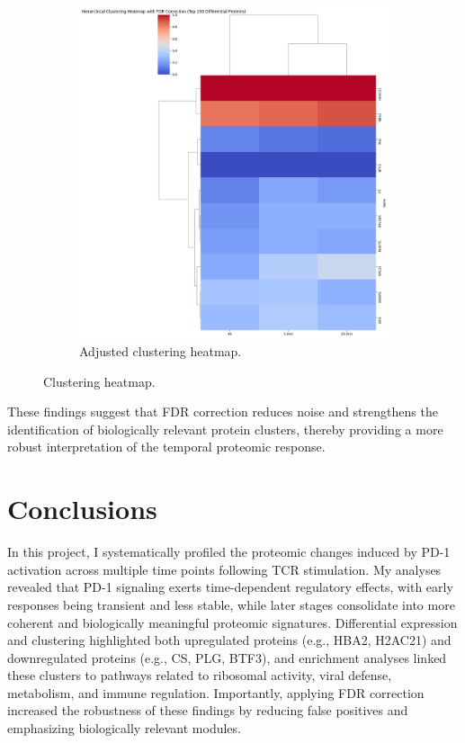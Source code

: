 \documentclass{article}
\begin{document}
\begin{figure}[H]
\begin{subfigure}{0.45\textwidth}
            \includegraphics[width=\linewidth]{figures/clustering_heatmap_fdr.png}
            \caption{Adjusted clustering heatmap.}
            \label{fig:clustering_heatmap_fdr}
        \end{subfigure}
        \caption{Clustering heatmap.}
        \label{fig:clustering_heatmap_all}
      \end{figure}
      
      These findings suggest that FDR correction reduces noise and strengthens the identification of biologically relevant protein clusters, thereby providing a more robust interpretation of the temporal proteomic response.

  \section{Conclusions}

    In this project, I systematically profiled the proteomic changes induced by PD-1 activation across multiple time points following TCR stimulation. My analyses revealed that PD-1 signaling exerts time-dependent regulatory effects, with early responses being transient and less stable, while later stages consolidate into more coherent and biologically meaningful proteomic signatures. Differential expression and clustering highlighted both upregulated proteins (e.g., HBA2, H2AC21) and downregulated proteins (e.g., CS, PLG, BTF3), and enrichment analyses linked these clusters to pathways related to ribosomal activity, viral defense, metabolism, and immune regulation. Importantly, applying FDR correction increased the robustness of these findings by reducing false positives and emphasizing biologically relevant modules.
\end{document}
